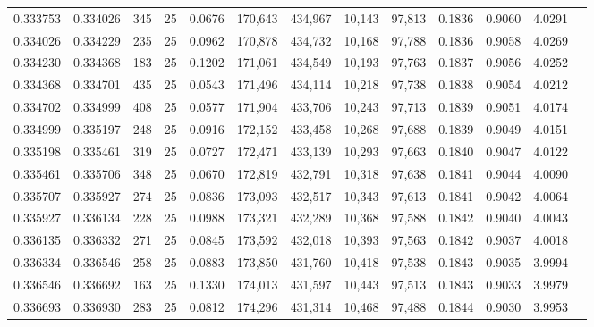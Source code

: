 \begin{tabular}{rrrrrrrrrrrrr}
0.333753 & 0.334026 &   345 &  25 &                                     0.0676 & 170,643 & 434,967 &  10,143 &  97,813 & 0.1836 & 0.9060 & 4.0291 \\
0.334026 & 0.334229 &   235 &  25 &                                     0.0962 & 170,878 & 434,732 &  10,168 &  97,788 & 0.1836 & 0.9058 & 4.0269 \\
0.334230 & 0.334368 &   183 &  25 &                                     0.1202 & 171,061 & 434,549 &  10,193 &  97,763 & 0.1837 & 0.9056 & 4.0252 \\
0.334368 & 0.334701 &   435 &  25 &                                     0.0543 & 171,496 & 434,114 &  10,218 &  97,738 & 0.1838 & 0.9054 & 4.0212 \\
0.334702 & 0.334999 &   408 &  25 &                                     0.0577 & 171,904 & 433,706 &  10,243 &  97,713 & 0.1839 & 0.9051 & 4.0174 \\
0.334999 & 0.335197 &   248 &  25 &                                     0.0916 & 172,152 & 433,458 &  10,268 &  97,688 & 0.1839 & 0.9049 & 4.0151 \\
0.335198 & 0.335461 &   319 &  25 &                                     0.0727 & 172,471 & 433,139 &  10,293 &  97,663 & 0.1840 & 0.9047 & 4.0122 \\
0.335461 & 0.335706 &   348 &  25 &                                     0.0670 & 172,819 & 432,791 &  10,318 &  97,638 & 0.1841 & 0.9044 & 4.0090 \\
0.335707 & 0.335927 &   274 &  25 &                                     0.0836 & 173,093 & 432,517 &  10,343 &  97,613 & 0.1841 & 0.9042 & 4.0064 \\
0.335927 & 0.336134 &   228 &  25 &                                     0.0988 & 173,321 & 432,289 &  10,368 &  97,588 & 0.1842 & 0.9040 & 4.0043 \\
0.336135 & 0.336332 &   271 &  25 &                                     0.0845 & 173,592 & 432,018 &  10,393 &  97,563 & 0.1842 & 0.9037 & 4.0018 \\
0.336334 & 0.336546 &   258 &  25 &                                     0.0883 & 173,850 & 431,760 &  10,418 &  97,538 & 0.1843 & 0.9035 & 3.9994 \\
0.336546 & 0.336692 &   163 &  25 &                                     0.1330 & 174,013 & 431,597 &  10,443 &  97,513 & 0.1843 & 0.9033 & 3.9979 \\
0.336693 & 0.336930 &   283 &  25 &                                     0.0812 & 174,296 & 431,314 &  10,468 &  97,488 & 0.1844 & 0.9030 & 3.9953 \\

\end{tabular}
